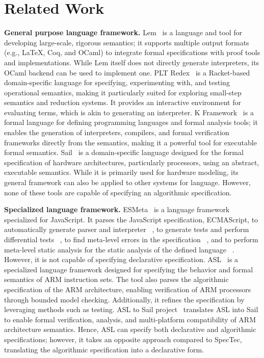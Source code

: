
\chapter{Related Work}
\label{ch:related}
\noindent



\textbf{General purpose language framework.}
Lem~\cite{lem} is a language and tool for developing large-scale, rigorous
semantics; it supports multiple output formats (e.g., LaTeX, Coq, and OCaml) to
integrate formal specifications with proof tools and implementations.
While Lem itself does not directly generate interpreters, its OCaml backend can
be used to implement one.
PLT Redex~\cite{plt} is a Racket-based domain-specific language for specifying,
experimenting with, and testing operational semantics, making it particularly
suited for exploring small-step semantics and reduction systems.
It provides an interactive environment for evaluating terms, which is akin to
generating an interpreter.
K Framework~\cite{k} is a formal language for defining programming languages
and formal analysis tools; it enables the generation of interpreters,
compilers, and formal verification frameworks directly from the semantics,
making it a powerful tool for executable formal semantics.
Sail~\cite{sail} is a domain-specific language designed for the formal
specification of hardware architectures, particularly processors, using an
abstract, executable semantics.
While it is primarily used for hardware modeling, its general framework can
also be applied to other systems for language.
However, none of these tools are capable of specifying an algorithmic
specification.


\textbf{Specialized language framework.}
ESMeta~\cite{esmeta} is a language framework specialized for JavaScript.
It parses the JavaScript specification, ECMAScript, to automatically generate
parser and interpreter ~\cite{jiset}, to generate tests and perform
differential tests ~\cite{jest}, to find meta-level errors in the specification
~\cite{jstar}, and to perform meta-level static analysis for the static
analysis of the defined language ~\cite{jsaver}.
However, it is not capable of specifying declarative specification.
ASL~\cite{asl} is a specialized language framework designed for specifying the
behavior and formal semantics of ARM instruction sets.
The tool also parses the algorithmic specification of the ARM architecture,
enabling verification of ARM processors through bounded model checking.
Additionally, it refines the specification by leveraging methods such as
testing.
ASL to Sail project~\cite{asl2sail} translates ASL into Sail to enable formal
verification, analysis, and multi-platform compatibility of ARM architecture
semantics.
Hence, ASL can specify both declarative and algorithmic specifications;
however, it takes an opposite approach compared to SpecTec, translating the
algorithmic specification into a declarative form.
